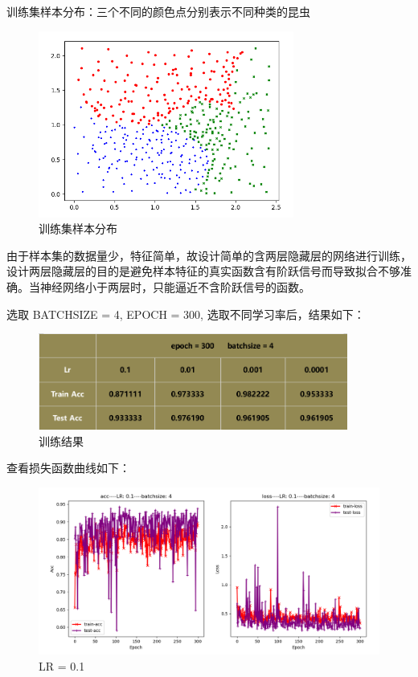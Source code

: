 \documentclass[12pt]{article}
\begin{document}
	训练集样本分布：三个不同的颜色点分别表示不同种类的昆虫
	
	\begin{figure}[H]
		\centering
		\includegraphics[width=3.3in]{./images/insects_normal_train_dist.png}
		\centering
		\caption{训练集样本分布}
	\end{figure}
	
	由于样本集的数据量少，特征简单，故设计简单的含两层隐藏层的网络进行训练，设计两层隐藏层的目的是避免样本特征的真实函数含有阶跃信号而导致拟合不够准确。当神经网络小于两层时，只能逼近不含阶跃信号的函数。
	
	选取 BATCHSIZE = 4, EPOCH = 300, 选取不同学习率后，结果如下：
	
	\begin{figure}[H]
		\centering
		\includegraphics[width=4in]{./images/insects_normal_train.png}
		\centering
		\caption{训练结果}
	\end{figure}
	
	查看损失函数曲线如下：
	
	\begin{figure}[H]
		\centering
		\includegraphics[width=5in]{./images/insects_normal_loss01.png}
		\centering
		\caption{LR = 0.1}
	\end{figure}
\end{document}
